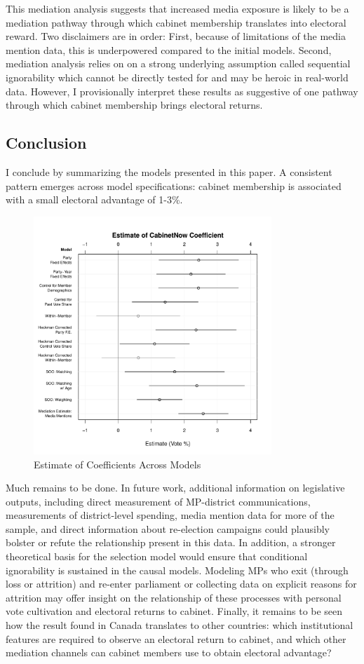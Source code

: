 \documentclass[letter,12pt]{article}
\begin{document}
This mediation analysis suggests that increased media exposure is likely to be a mediation pathway through which cabinet membership translates into electoral reward. Two disclaimers are in order: First, because of limitations of the media mention data, this is underpowered compared to the initial models. Second, mediation analysis relies on on a strong underlying assumption called sequential ignorability which cannot be directly tested for and may be heroic in real-world data. However, I provisionally interpret these results as suggestive of one pathway through which cabinet membership brings electoral returns.

\subsection*{Conclusion}
I conclude by summarizing the models presented in this paper. A consistent pattern emerges across model specifications: cabinet membership is associated with a small electoral advantage of 1-3\%.
\begin{figure}[!htb]
\centering
\caption{Estimate of Coefficients Across Models}
	\includegraphics[width = 0.8\textwidth]{includes/estimatePlot}
\end{figure}

Much remains to be done. In future work, additional information on legislative outputs, including direct measurement of MP-district communications, measurements of district-level spending, media mention data for more of the sample, and direct information about re-election campaigns could plausibly bolster or refute the relationship present in this data. In addition, a stronger theoretical basis for the selection model would ensure that conditional ignorability is sustained in the causal models. Modeling MPs who exit (through loss or attrition) and re-enter parliament or collecting data on explicit reasons for attrition may offer insight on the relationship of these processes with personal vote cultivation and electoral returns to cabinet. Finally, it remains to be seen how the result found in Canada translates to other countries: which institutional features are required to observe an electoral return to cabinet, and which other mediation channels can cabinet members use to obtain electoral advantage? 
\end{document}
